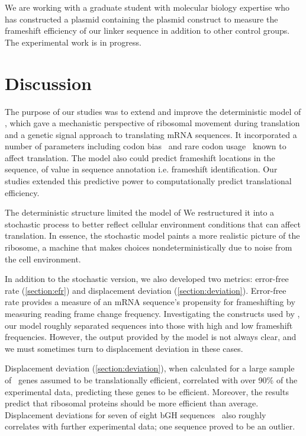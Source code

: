 \documentclass[12pt]{article}
\begin{document}
We are working with a graduate student with molecular biology expertise 
who has constructed a plasmid containing the plasmid construct
to measure the frameshift efficiency of our linker sequence in addition 
to other control groups. The experimental work is in progress.

\section{Discussion}
\label{section:discussion}

The purpose of our studies was to extend and improve the deterministic
model of \citeauthor{lalit:mechanics}, which gave a mechanistic
perspective of ribosomal movement during translation and a genetic
signal approach to translating mRNA sequences. It incorporated a
number of parameters including
codon bias~\cite{ikemura} and rare codon usage~\cite{kane95} known to
affect translation. The model also could predict frameshift locations
in the sequence, of value in sequence annotation i.e. frameshift identification.
Our studies extended this predictive power to 
computationally predict translational efficiency.

The deterministic structure limited the model of \citeauthor{lalit:mechanics}
We restructured it into a stochastic process to better reflect cellular
environment conditions that can affect translation. In essence, the
stochastic model paints a more realistic picture of the ribosome, a
machine that makes choices nondeterministically due to noise from the
cell environment.

In addition to the stochastic version, we also developed two metrics:
error-free rate (\autoref{section:efr}) and displacement deviation
(\autoref{section:deviation}). Error-free rate
provides a measure of an mRNA sequence's propensity for frameshifting by
measuring reading frame change frequency.  Investigating the constructs used by
\citet{weiss87}, our model roughly separated sequences into
those with high and low frameshift frequencies. However, the
output provided by the model is not always clear, and we must sometimes turn to
displacement deviation in these cases.

Displacement deviation (\autoref{section:deviation}),
when calculated for a large sample of \ecoli\ genes assumed to be translationally efficient,
correlated with over 90\% of the  experimental data, predicting
these genes to be efficient.  Moreover, the results predict that ribosomal proteins should
be more efficient than average.  Displacement deviations for seven of eight bGH
sequences~\cite{schoner:bgh} also roughly correlates with further
experimental data; one sequence proved to be an outlier.
\end{document}
